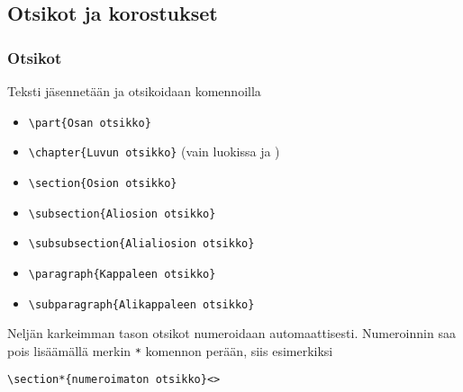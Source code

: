 \subsection{Otsikot ja korostukset}
\begin{fframe}
    \frametitle{Otsikot}
    Teksti jäsennetään ja otsikoidaan komennoilla 
    \begin{itemize}[<+->]
        \item \lstinline-\part{Osan otsikko}-
        \item \lstinline-\chapter{Luvun otsikko}- (vain luokissa  ja )
        \item \lstinline-\section{Osion otsikko}-
        \item \lstinline-\subsection{Aliosion otsikko}-
        \item \lstinline-\subsubsection{Alialiosion otsikko}-
        \item \lstinline-\paragraph{Kappaleen otsikko}-
        \item \lstinline-\subparagraph{Alikappaleen otsikko}-
    \end{itemize} \pause
    Neljän karkeimman tason otsikot numeroidaan automaattisesti. \pause Numeroinnin saa pois lisäämällä merkin \lstinline-*- komennon perään, siis esimerkiksi 
    \begin{lstlisting}
\section*{numeroimaton otsikko}<>
    \end{lstlisting}
\end{fframe}

